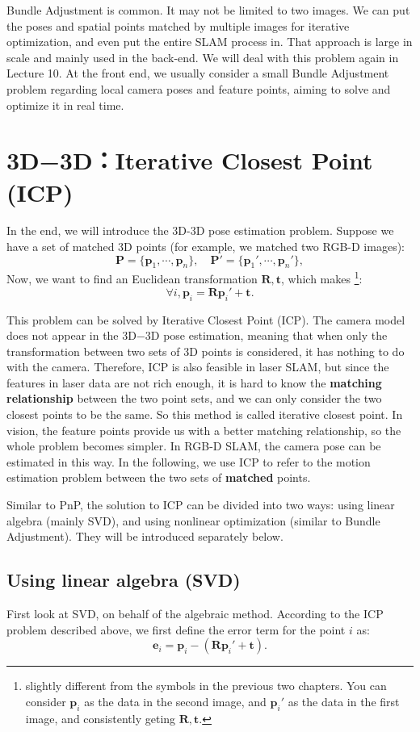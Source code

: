 Bundle Adjustment is common. It may not be limited to two images. We can put the poses and spatial points matched by multiple images for iterative optimization, and even put the entire SLAM process in. That approach is large in scale and mainly used in the back-end. We will deal with this problem again in Lecture 10. At the front end, we usually consider a small Bundle Adjustment problem regarding local camera poses and feature points, aiming to solve and optimize it in real time.

\section{3D−3D：Iterative Closest Point (ICP)}
In the end, we will introduce the 3D-3D pose estimation problem. Suppose we have a set of matched 3D points (for example, we matched two RGB-D images):
\[
\bm{P} = \{ \bm{p}_1, \cdots, \bm{p}_n \}, \quad \bm{P}' = \{ \bm{p}_1', \cdots, \bm{p}_n'\},
\]
Now, we want to find an Euclidean transformation $\bm{R}, \bm{t}$, which makes \footnote{slightly different from the symbols in the previous two chapters. You can consider $\bm{p}_i$ as the data in the second image, and $\bm{p}_i'$ as the data in the first image, and consistently geting $ \bm{R},\bm{t}$.}:
\[
\forall i, \bm{p}_i = \bm{R} \bm{p}_i' + \bm{t}.
\]

This problem can be solved by Iterative Closest Point (ICP). The camera model does not appear in the 3D−3D pose estimation, meaning that when only the transformation between two sets of 3D points is considered, it has nothing to do with the camera. Therefore, ICP is also feasible in laser SLAM, but since the features in laser data are not rich enough, it is hard to know the \textbf{matching relationship} between the two point sets, and we can only consider the two closest points to be the same. So this method is called iterative closest point. In vision, the feature points provide us with a better matching relationship, so the whole problem becomes simpler. In RGB-D SLAM, the camera pose can be estimated in this way. In the following, we use ICP to refer to the motion estimation problem between the two sets of \textbf{matched} points.

Similar to PnP, the solution to ICP can be divided into two ways: using linear algebra (mainly SVD), and using nonlinear optimization (similar to Bundle Adjustment). They will be introduced separately below.

\subsection{Using linear algebra (SVD)}
First look at SVD, on behalf of the algebraic method. According to the ICP problem described above, we first define the error term for the point $i$ as:
\begin{equation}
\bm{e}_i = \bm{p}_i - (\bm{R} \bm{p}_i' + \bm{t} ) .
\end{equation}

